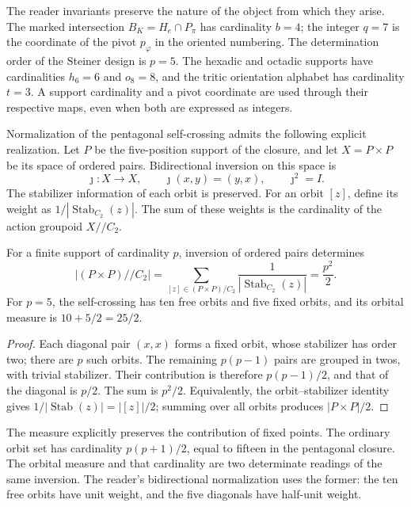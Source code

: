 The reader invariants preserve the nature of the object from which
they arise. The marked intersection $B_K=H_e\cap P_\pi$ has cardinality
$b=4$; the integer $q=7$ is the coordinate of the pivot $p_\varphi$ in
the oriented numbering. The determination order of the Steiner
design is $p=5$. The hexadic and octadic supports have cardinalities $h_6=6$
and $o_8=8$, and the tritic orientation alphabet has cardinality $t=3$.
A support cardinality and a pivot coordinate are used through
their respective maps, even when both are expressed as integers.

Normalization of the pentagonal self-crossing admits the following
explicit realization. Let $P$ be the five-position support of the closure,
and let $X=P\times P$ be its space of ordered pairs. Bidirectional
inversion on this space is
\[
 \jmath:X\longrightarrow X,\qquad \jmath(x,y)=(y,x),
 \qquad\jmath^2=I.
\]
The stabilizer information of each orbit is preserved. For an
orbit $[z]$, define its weight as
$1/|\operatorname{Stab}_{C_2}(z)|$. The sum of these weights is the
cardinality of the action groupoid $X/\!/C_2$.

\begin{proposition}
\label{ii:prop:ii09-semicuadrado-orbital}
For a finite support of cardinality $p$, inversion of ordered pairs
determines
\[
 |(P\times P)/\!/C_2|
 =\sum_{[z]\in(P\times P)/C_2}
      \frac1{|\operatorname{Stab}_{C_2}(z)|}
 =\frac{p^2}{2}.
\]
For $p=5$, the self-crossing has ten free orbits and five fixed
orbits, and its orbital measure is $10+5/2=25/2$.
\end{proposition}
\begin{proof}
Each diagonal pair $(x,x)$ forms a fixed orbit, whose stabilizer
has order two; there are $p$ such orbits. The remaining $p(p-1)$ pairs
are grouped in twos, with trivial stabilizer. Their contribution is
therefore $p(p-1)/2$, and that of the diagonal is $p/2$. The sum is
$p^2/2$. Equivalently, the orbit--stabilizer identity gives
$1/|\operatorname{Stab}(z)|=|[z]|/2$; summing over all orbits
produces $|P\times P|/2$.
\end{proof}

The measure explicitly preserves the contribution of fixed points.
The ordinary orbit set has cardinality $p(p+1)/2$, equal to
fifteen in the pentagonal closure. The orbital measure and that cardinality
are two determinate readings of the same inversion. The reader's
bidirectional normalization uses the former: the ten free orbits
have unit weight, and the five diagonals have half-unit weight.

